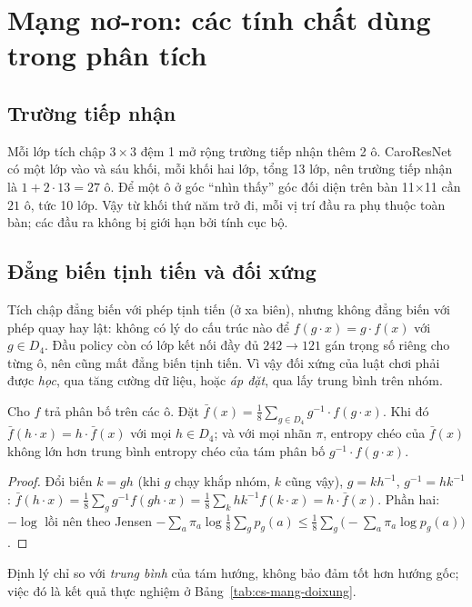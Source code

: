 \section{Mạng nơ-ron: các tính chất dùng trong phân tích}
\label{sec:cs-mang-lt}
\subsection{Trường tiếp nhận}
Mỗi lớp tích chập $3\times3$ đệm 1 mở rộng trường tiếp nhận thêm 2 ô. CaroResNet có một lớp vào và sáu khối, mỗi
khối hai lớp, tổng 13 lớp, nên trường tiếp nhận là $1+2\cdot13=27$ ô. Để một ô ở góc ``nhìn thấy'' góc đối diện
trên bàn 11$\times$11 cần $21$ ô, tức 10 lớp. Vậy từ khối thứ năm trở đi, mỗi vị trí đầu ra phụ thuộc toàn bàn;
các đầu ra không bị giới hạn bởi tính cục bộ.

\subsection{Đẳng biến tịnh tiến và đối xứng}
Tích chập đẳng biến với phép tịnh tiến (ở xa biên), nhưng không đẳng biến với phép quay hay lật: không có lý do
cấu trúc nào để $f(g\cdot x)=g\cdot f(x)$ với $g\in D_4$. Đầu policy còn có lớp kết nối đầy đủ
$242\to121$ gán trọng số riêng cho từng ô, nên cũng mất đẳng biến tịnh tiến. Vì vậy đối xứng của luật chơi phải
được \emph{học}, qua tăng cường dữ liệu, hoặc \emph{áp đặt}, qua lấy trung bình trên nhóm.

\begin{dinhly}
\label{dl:cs-d4}
Cho $f$ trả phân bố trên các ô. Đặt $\bar f(x)=\frac18\sum_{g\in D_4}g^{-1}\cdot f(g\cdot x)$. Khi đó
$\bar f(h\cdot x)=h\cdot\bar f(x)$ với mọi $h\in D_4$; và với mọi nhãn $\pi$, entropy chéo của $\bar f(x)$ không
lớn hơn trung bình entropy chéo của tám phân bố $g^{-1}\cdot f(g\cdot x)$.
\end{dinhly}
\begin{proof}
Đổi biến $k=gh$ (khi $g$ chạy khắp nhóm, $k$ cũng vậy), $g=kh^{-1}$, $g^{-1}=hk^{-1}$:
$\bar f(h\cdot x)=\frac18\sum_g g^{-1}f(gh\cdot x)=\frac18\sum_k h k^{-1}f(k\cdot x)=h\cdot\bar f(x)$.
Phần hai: $-\log$ lồi nên theo Jensen
$-\sum_a\pi_a\log\frac18\sum_g p_g(a)\le \frac18\sum_g\bigl(-\sum_a\pi_a\log p_g(a)\bigr)$.
\end{proof}
Định lý chỉ so với \emph{trung bình} của tám hướng, không bảo đảm tốt hơn hướng gốc; việc đó là kết quả thực
nghiệm ở Bảng~\ref{tab:cs-mang-doixung}.

